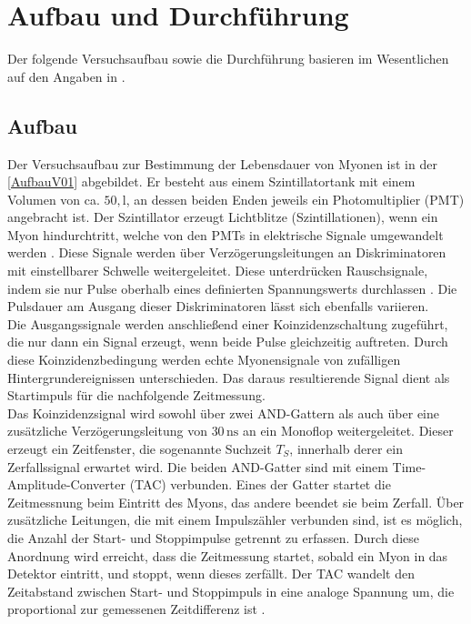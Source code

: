 \section{Aufbau und Durchführung}
Der folgende Versuchsaufbau sowie die Durchführung basieren im Wesentlichen auf den Angaben in \cite{anleitungV01}.
\subsection{Aufbau}
\label{Aufbau}
Der Versuchsaufbau zur Bestimmung der Lebensdauer von Myonen ist in der \autoref{AufbauV01} abgebildet.
Er besteht aus einem Szintillatortank mit einem Volumen von ca. $50,\unit{\litre}$, an dessen beiden Enden jeweils ein Photomultiplier (PMT) angebracht ist.
Der Szintillator erzeugt Lichtblitze (Szintillationen), wenn ein Myon hindurchtritt, welche von den PMTs in elektrische Signale umgewandelt werden \cite{Teilchendetektoren}.
Diese Signale werden über Verzögerungsleitungen an Diskriminatoren mit einstellbarer Schwelle weitergeleitet. Diese unterdrücken Rauschsignale, indem sie nur Pulse oberhalb eines definierten Spannungswerts durchlassen \cite{Techniques}.
Die Pulsdauer am Ausgang dieser Diskriminatoren lässt sich ebenfalls variieren.\\
Die Ausgangssignale werden anschließend einer Koinzidenzschaltung zugeführt, 
die nur dann ein Signal erzeugt, wenn beide Pulse gleichzeitig auftreten. 
Durch diese Koinzidenzbedingung werden echte Myonensignale von zufälligen Hintergrundereignissen unterschieden.
Das daraus resultierende Signal dient als Startimpuls für die nachfolgende Zeitmessung.\\
Das Koinzidenzsignal wird sowohl über zwei AND-Gattern als auch über eine zusätzliche Verzögerungsleitung von $30\,\unit{\nano\second}$ an ein Monoflop
weitergeleitet. Dieser erzeugt ein Zeitfenster, die sogenannte Suchzeit $T_S$, innerhalb derer ein Zerfallssignal erwartet wird. 
Die beiden AND-Gatter sind mit einem Time-Amplitude-Converter (TAC) verbunden. Eines der Gatter startet die Zeitmessnung beim Eintritt
des Myons, das andere beendet sie beim Zerfall.
Über zusätzliche Leitungen, die mit einem Impulszähler verbunden sind, ist es möglich, die Anzahl der
Start- und Stoppimpulse getrennt zu erfassen. Durch diese Anordnung wird erreicht, dass die Zeitmessung startet, sobald ein Myon in das Detektor eintritt, und stoppt, wenn dieses zerfällt. 
Der TAC wandelt den Zeitabstand zwischen Start- und Stoppimpuls in eine analoge Spannung um, die proportional zur gemessenen Zeitdifferenz ist \cite{Techniques}.\\
